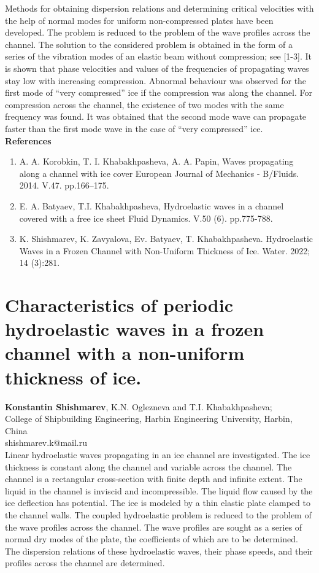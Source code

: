 \documentclass[9pt,a4paper,oneside]{book}
\numberwithin{equation}{section}
\begin{document}
Methods for obtaining dispersion relations and determining critical velocities with the help of normal modes for uniform non-compressed plates have been developed. The problem is reduced to the problem of the wave profiles across the channel. The solution to the considered problem is obtained in the form of a series of the vibration modes of an elastic beam without compression; see [1-3]. It is shown that phase velocities and values of the frequencies of propagating waves stay low with increasing compression. Abnormal behaviour was observed for the first mode of “very compressed” ice if the compression was along the channel.  For compression across the channel, the existence of two modes with the same frequency was found. It was obtained that the second mode wave can propagate faster than the first mode wave in the case of “very compressed” ice.
\\
\textbf{References}
\begin{enumerate}
    \item A. A. Korobkin, T. I. Khabakhpasheva, A. A. Papin, Waves propagating along a channel with ice cover European Journal of Mechanics - B/Fluids. 2014. V.47. pp.166–175.
    \item E. A. Batyaev, T.I. Khabakhpasheva, Hydroelastic waves in a channel covered with a free ice sheet  Fluid Dynamics. V.50 (6). pp.775-788.
    \item K. Shishmarev,  K. Zavyalova,  Ev. Batyaev, T. Khabakhpasheva. Hydroelastic Waves in a Frozen Channel with Non-Uniform Thickness of Ice. Water. 2022; 14 (3):281.
\end{enumerate}

\section*{Characteristics of periodic hydroelastic waves in a frozen channel with a non-uniform thickness of ice.}
 \label{abs:11}
  {\bf Konstantin Shishmarev}, K.N. Oglezneva and T.I. Khabakhpasheva;\\
College of Shipbuilding Engineering, Harbin Engineering University, Harbin, China\\
shishmarev.k@mail.ru\\

Linear hydroelastic waves propagating in an ice channel are investigated. The ice thickness is constant along the channel and variable across the channel. The channel is a rectangular cross-section with finite depth and infinite extent. The liquid in the channel is inviscid and incompressible. The liquid flow caused by the ice deflection has potential. The ice is modeled by a thin elastic plate clamped to the channel walls. The coupled hydroelastic problem is reduced to the problem of the wave profiles across the channel. The wave profiles are sought as a series of normal dry modes of the plate, the coefficients of which are to be determined. The dispersion relations of these hydroelastic waves, their phase speeds, and their profiles across the channel are determined.
\end{document}

